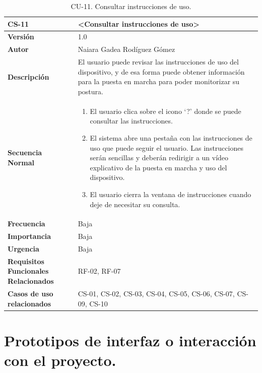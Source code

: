 \begin{table}[h!]
\centering
\begin{tabular}{ |m{3cm}|m{11cm}|  } 
\hline
\cellcolor[HTML]{B9E3F0}\textbf{CS-11} & \cellcolor[HTML]{B9E3F0}\textbf{<Consultar instrucciones de uso>}\\

\hline
\cellcolor[HTML]{EFEFEF}\textbf{Versión}             & 1.0  \\
\hline
\cellcolor[HTML]{EFEFEF}\textbf{Autor}                & Naiara Gadea Rodíguez Gómez\\
\hline
\cellcolor[HTML]{EFEFEF}\textbf{Descripción}                & {El usuario puede revisar las instrucciones de uso del dispositivo, y de esa forma puede obtener información para la puesta en marcha para poder monitorizar su postura.}\\
\hline
\cellcolor[HTML]{EFEFEF}\textbf{Secuencia \newline Normal}                &                 
        \begin{enumerate}
			\def\labelenumi{\arabic{enumi}.}
			\tightlist
			\item El usuario clica sobre el icono ‘?’ donde se puede consultar las instrucciones.
			\item El sistema abre una pestaña con las instrucciones de uso que puede seguir el usuario. Las instrucciones serán sencillas y deberán redirigir a un vídeo explicativo de la puesta en marcha y uso del dispositivo.
                \item El usuario cierra la ventana de instrucciones cuando deje de necesitar su consulta. 
		\end{enumerate}\\
\hline
\cellcolor[HTML]{EFEFEF}\textbf{Frecuencia}                & Baja\\
\hline
\cellcolor[HTML]{EFEFEF}\textbf{Importancia}                & Baja\\
\hline
\cellcolor[HTML]{EFEFEF}\textbf{Urgencia}                & Baja\\
\hline
\cellcolor[HTML]{EFEFEF}\textbf{Requisitos Funcionales Relacionados}                & {RF-02, RF-07}\\
\hline
\cellcolor[HTML]{EFEFEF}\textbf{Casos de uso relacionados}                & {CS-01, CS-02, CS-03, CS-04, CS-05, CS-06, CS-07, CS-09, CS-10 }\\
\hline
\end{tabular}
\caption{CU-11. Consultar instrucciones de uso.}
\end{table}


\clearpage

\section{Prototipos de interfaz o interacción con el proyecto.}
